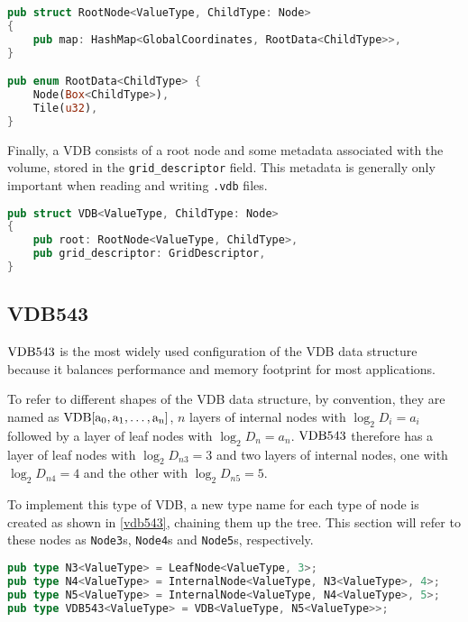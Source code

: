 \begin{lstlisting}[language=rust, captionpos=b, caption={
    \texttt{RootNode} definition. \texttt{RootData} is either a pointer to a child or 4 bytes of data for a tile value.
  },label={code:root}]
pub struct RootNode<ValueType, ChildType: Node>
{
    pub map: HashMap<GlobalCoordinates, RootData<ChildType>>,
}

pub enum RootData<ChildType> {
    Node(Box<ChildType>),
    Tile(u32),
}
\end{lstlisting}

Finally, a VDB consists of a root node and some metadata associated with the volume, stored in the \verb|grid_descriptor| field. This metadata is generally only important when reading and writing \verb|.vdb| files.

\begin{lstlisting}[language=rust, captionpos=b, caption={\texttt{VDB} definition}, label={vdb:def}]
pub struct VDB<ValueType, ChildType: Node>
{
    pub root: RootNode<ValueType, ChildType>,
    pub grid_descriptor: GridDescriptor,
}
\end{lstlisting}

\subsection{VDB543}
$\rm{VDB}543$ is the most widely used configuration of the VDB data structure because it balances performance and memory footprint for most applications.
\begin{sloppypar}
  To refer to different shapes of the VDB data structure, by convention, they are named as ${\rm{VDB}[a_{0},a_{1},\dots, a_{n}]}$, $n$ layers of internal nodes with $\log_{2}D_{i}=a_{i}$ followed by a layer of leaf nodes with $\log_{2}D_{n}=a_{n}$. $\rm{VDB}543$ therefore has a layer of leaf nodes with $\log_{2}D_{n3} = 3$ and two layers of internal nodes, one with $\log_{2}D_{n4} = 4$ and the other with $\log_{2}D_{n5} = 5$.
\end{sloppypar}

To implement this type of VDB, a new type name for each type of node is created as shown in \cref{vdb543}, chaining them up the tree. This section will refer to these nodes as \texttt{Node3}s, \texttt{Node4}s and \texttt{Node5}s, respectively.

\begin{lstlisting}[language=rust, captionpos=b, caption={\texttt{VDB543} definition}, label={vdb543}]
pub type N3<ValueType> = LeafNode<ValueType, 3>;
pub type N4<ValueType> = InternalNode<ValueType, N3<ValueType>, 4>;
pub type N5<ValueType> = InternalNode<ValueType, N4<ValueType>, 5>;
pub type VDB543<ValueType> = VDB<ValueType, N5<ValueType>>;
\end{lstlisting}

